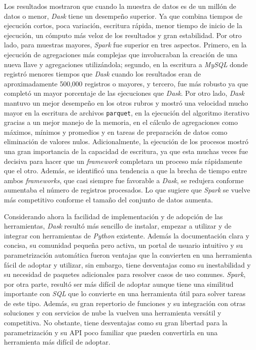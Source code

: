 \documentclass[11pt, oneside]{book}
\begin{document}
Los resultados mostraron que cuando la muestra de datos es de un millón de datos o menor, \textit{Dask} tiene un desempeño superior. Ya que combina tiempos de ejecución cortos, poca variación, 
escritura rápida, menor tiempo de inicio de la ejecución, un cómputo más veloz de los resultados y gran estabilidad. Por otro lado, para muestras mayores, \textit{Spark} fue superior en tres aspectos. Primero, en la ejecución de agregaciones más complejas que involucraban la creación de una nueva llave y agregaciones utilizándola; segundo, en la escritura a \textit{MySQL} donde registró menores tiempos que \textit{Dask} cuando los resultados eran de aproximadamente 500,000 registros o mayores, y tercero, fue más robusto ya que completó un mayor porcentaje de las ejecuciones que \textit{Dask}. Por otro lado, \textit{Dask} mantuvo un mejor desempeño en los otros rubros y mostró una velocidad mucho mayor en la escritura de archivos \texttt{parquet}, en la ejecución del algoritmo iterativo gracias a un mejor manejo de la memoria, en el cálculo de agregaciones como máximos, mínimos y promedios y en tareas de preparación de datos como eliminación de valores nulos. Adicionalmente, la ejecución de los procesos mostró una gran importancia de la capacidad de escritura, ya que esta muchas veces fue decisiva para hacer que un \textit{framework} completara un proceso más rápidamente que el otro. Además, se identificó una tendencia a que la brecha de tiempo entre ambos \textit{frameworks}, que casi siempre fue favorable a \textit{Dask}, se redujera conforme aumentaba el número de registros procesados. Lo que sugiere que \textit{Spark} se vuelve más competitivo conforme el tamaño del conjunto de datos aumenta.

Considerando ahora la facilidad de implementación y de adopción de las herramientas, \textit{Dask} resultó más sencillo de instalar, empezar a utilizar y de integrar con herramientas de \textit{Python} existente. Además la documentación clara y concisa, su comunidad pequeña pero activa, un portal de usuario intuitivo y su parametrización automática fueron ventajas que la convierten en una herramienta fácil de adoptar y utilizar, sin embargo, tiene desventajas como su inestabilidad y su necesidad de paquetes adicionales para resolver casos de uso comunes. \textit{Spark}, por otra parte, resultó ser más difícil de adoptar aunque tiene una similitud importante con \textit{SQL} que lo convierte en una herramienta útil para solver tareas de este tipo. Además, su gran repertorio de funciones y su integración con otras soluciones y con servicios de nube la vuelven una herramienta versátil y competitiva. No obstante, tiene desventajas como su gran libertad para la parametrización y su API poco familiar que pueden convertirla en una herramienta más difícil de adoptar.
\end{document}
